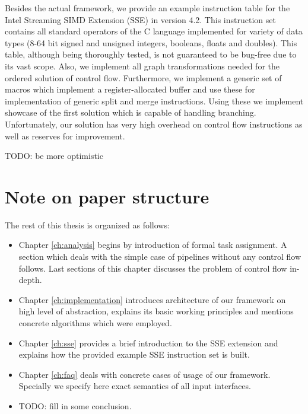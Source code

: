 Besides the actual framework, we provide an example instruction table for the Intel Streaming SIMD Extension (SSE) in version 4.2. This instruction set contains all standard operators of the C language implemented for variety of data types (8-64 bit signed and unsigned integers, booleans, floats and doubles). This table, although being thoroughly tested, is not guaranteed to be bug-free due to its vast scope. Also, we implement all graph transformations needed for the ordered solution of control flow. Furthermore, we implement a generic set of macros which implement a register-allocated buffer and use these for implementation of generic split and merge instructions. Using these we implement showcase of the first solution which is capable of handling branching. Unfortunately, our solution has very high overhead on control flow instructions as well as reserves for improvement. 

TODO: be more optimistic

\section{Note on paper structure}

The rest of this thesis is organized as follows:
\begin{itemize}
  \item Chapter \ref{ch:analysis} begins by introduction of formal task assignment. A section which deals with the simple case of pipelines without any control flow follows. Last sections of this chapter discusses the problem of control flow in-depth.
  \item Chapter \ref{ch:implementation} introduces architecture of our framework on high level of abstraction, explains its basic working principles and mentions concrete algorithms which were employed.
  \item Chapter \ref{ch:sse} provides a brief introduction to the SSE extension and explains how the provided example SSE instruction set is built.
  \item Chapter \ref{ch:faq} deals with concrete cases of usage of our framework. Specially we specify here exact semantics of all input interfaces.
  \item TODO: fill in some conclusion.
\end{itemize}



